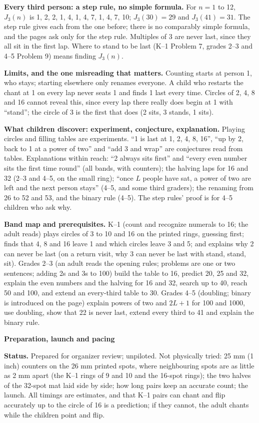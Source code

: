 \documentclass[11pt]{article}
\newcommand{\head}[1]{\par\textbf{\large #1}\par}
\newcommand{\say}[1]{``#1''}
\begin{document}
\textbf{Every third person: a step rule, no simple formula.} For $n=1$ to 12, $J_3(n)$ is 1, 2, 2, 1, 4, 1, 4, 7, 1, 4, 7, 10; $J_3(30)=29$ and $J_3(41)=31$. The step rule gives each from the one before; there is no comparably simple formula, and the pages ask only for the step rule. Multiples of 3 are never last, since they all sit in the first lap. Where to stand to be last (K--1 Problem 7, grades 2--3 and 4--5 Problem 9) means finding $J_3(n)$.

\textbf{Limits, and the one misreading that matters.} Counting starts at person 1, who stays; starting elsewhere only renames everyone. A child who restarts the chant at 1 on every lap never seats 1 and finds 1 last every time. Circles of 2, 4, 8 and 16 cannot reveal this, since every lap there really does begin at 1 with \say{stand}; the circle of 3 is the first that does (2 sits, 3 stands, 1 sits).

\textbf{What children discover: experiment, conjecture, explanation.} Playing circles and filling tables are experiments. \say{1 is last at 1, 2, 4, 8, 16}, \say{up by 2, back to 1 at a power of two} and \say{add 3 and wrap} are conjectures read from tables. Explanations within reach: \say{2 always sits first} and \say{every even number sits the first time round} (all bands, with counters); the halving laps for 16 and 32 (2--3 and 4--5, on the small ring); \say{once $L$ people have sat, a power of two are left and the next person stays} (4--5, and some third graders); the renaming from 26 to 52 and 53, and the binary rule (4--5). The step rules' proof is for 4--5 children who ask why.

\textbf{Band map and prerequisites.} K--1 (count and recognize numerals to 16; the adult reads) plays circles of 3 to 10 and 16 on the printed rings, guessing first; finds that 4, 8 and 16 leave 1 and which circles leave 3 and 5; and explains why 2 can never be last (on a return visit, why 3 can never be last with stand, stand, sit). Grades 2--3 (an adult reads the opening rules; problems are one or two sentences; adding 2s and 3s to 100) build the table to 16, predict 20, 25 and 32, explain the even numbers and the halving for 16 and 32, search up to 40, reach 50 and 100, and extend an every-third table to 30. Grades 4--5 (doubling; binary is introduced on the page) explain powers of two and $2L+1$ for 100 and 1000, use doubling, show that 22 is never last, extend every third to 41 and explain the binary rule.
\newpage
\head{Preparation, launch and pacing}
\textbf{Status.} Prepared for organizer review; unpiloted. Not physically tried: 25 mm (1 inch) counters on the 26 mm printed spots, where neighbouring spots are as little as 2 mm apart (the K--1 rings of 9 and 10 and the 16-spot rings); the two halves of the 32-spot mat laid side by side; how long pairs keep an accurate count; the launch. All timings are estimates, and that K--1 pairs can chant and flip accurately up to the circle of 16 is a prediction; if they cannot, the adult chants while the children point and flip.
\end{document}
